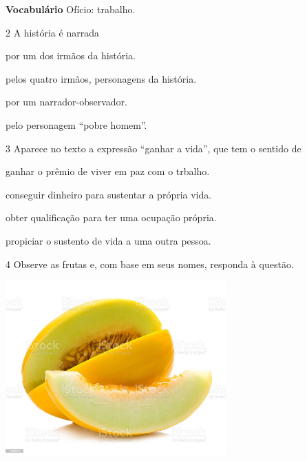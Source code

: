 \textbf{Vocabulário}
Ofício: trabalho.

\num{2} A história é narrada

\begin{escolha}
\item por um dos irmãos da história.

\item pelos quatro irmãos, personagens da história.

\item por um narrador-observador.

\item pelo personagem ``pobre homem''.
\end{escolha}



\num{3} Aparece no texto a expressão ``ganhar a vida'', que tem o sentido de

\begin{escolha}
\item ganhar o prêmio de viver em paz com o trbalho.

\item conseguir dinheiro para sustentar a própria vida.

\item obter qualificação para ter uma ocupação própria.

\item propiciar o sustento de vida a uma outra pessoa.
\end{escolha}


\num{4} Observe as frutas e, com base em seus nomes, responda à questão.



\includegraphics[width=3.33412in,height=2.64722in]{./media/image39.jpeg}


